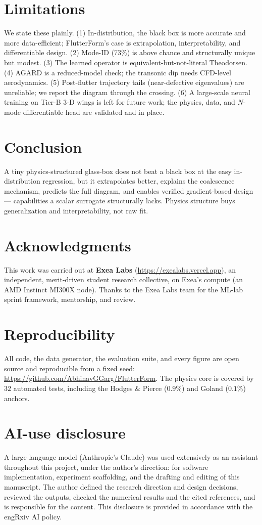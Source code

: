\documentclass{article}
\begin{document}
\section{Limitations}
We state these plainly. (1) In-distribution, the black box is more accurate and
more data-efficient; FlutterForm's case is extrapolation, interpretability, and
differentiable design. (2) Mode-ID ($73\%$) is above chance and structurally
unique but modest. (3) The learned operator is equivalent-but-not-literal
Theodorsen. (4) AGARD is a reduced-model check; the transonic dip needs CFD-level
aerodynamics. (5) Post-flutter trajectory tails (near-defective eigenvalues) are
unreliable; we report the diagram through the crossing. (6) A large-scale neural
training on Tier-B 3-D wings is left for future work; the physics, data, and
$N$-mode differentiable head are validated and in place.

\section{Conclusion}
A tiny physics-structured glass-box does not beat a black box at the easy
in-distribution regression, but it extrapolates better, explains the coalescence
mechanism, predicts the full diagram, and enables verified gradient-based design
--- capabilities a scalar surrogate structurally lacks. Physics structure buys
generalization and interpretability, not raw fit.

\section*{Acknowledgments}
This work was carried out at \textbf{Exea Labs} (\url{https://exealabs.vercel.app}),
an independent, merit-driven student research collective, on Exea's compute (an AMD
Instinct MI300X node). Thanks to the Exea Labs team for the ML-lab sprint
framework, mentorship, and review.

\section*{Reproducibility}
All code, the data generator, the evaluation suite, and every figure are open
source and reproducible from a fixed seed:
\;\url{https://github.com/AbhinavGGarg/FlutterForm}. The physics core is covered by
$32$ automated tests, including the Hodges \& Pierce ($0.9\%$) and Goland ($0.1\%$)
anchors.

\section*{AI-use disclosure}
A large language model (Anthropic's Claude) was used extensively as an assistant
throughout this project, under the author's direction: for software
implementation, experiment scaffolding, and the drafting and editing of this
manuscript. The author defined the research direction and design decisions,
reviewed the outputs, checked the numerical results and the cited references, and
is responsible for the content. This disclosure is provided in accordance with the
engRxiv AI policy.
\end{document}
